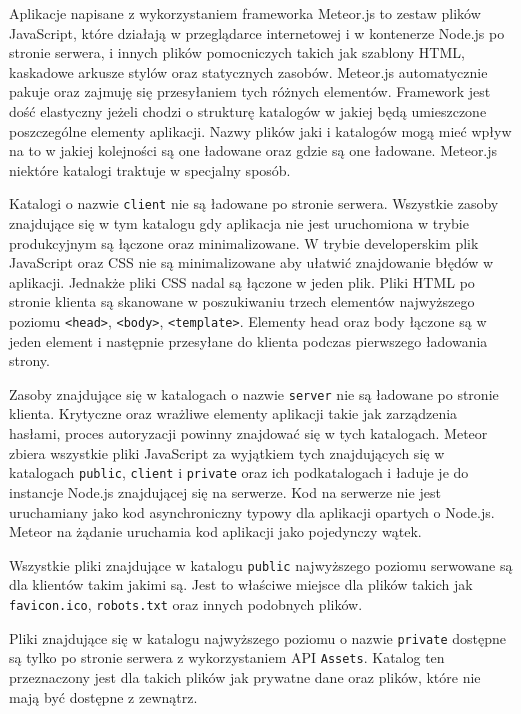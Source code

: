Aplikacje napisane z wykorzystaniem frameworka Meteor.js to zestaw plików JavaScript, które działają w przeglądarce internetowej i w kontenerze Node.js po stronie serwera, i innych plików pomocniczych takich jak szablony HTML, kaskadowe arkusze stylów oraz statycznych zasobów. Meteor.js automatycznie pakuje oraz zajmuję się przesyłaniem tych różnych elementów. Framework jest dość elastyczny jeżeli chodzi o strukturę katalogów w jakiej będą umieszczone poszczególne elementy aplikacji. Nazwy plików jaki i katalogów mogą mieć wpływ na to w jakiej kolejności są one ładowane oraz gdzie są one ładowane. Meteor.js niektóre katalogi traktuje w specjalny sposób.

Katalogi o nazwie \verb|client| nie są ładowane po stronie serwera. Wszystkie zasoby znajdujące się w tym katalogu gdy aplikacja nie jest uruchomiona w trybie produkcyjnym są łączone oraz minimalizowane. W trybie developerskim plik JavaScript oraz CSS nie są minimalizowane aby ułatwić znajdowanie błędów w aplikacji. Jednakże pliki CSS nadal są łączone w jeden plik. Pliki HTML po stronie klienta są skanowane w poszukiwaniu trzech elementów najwyższego poziomu \verb|<head>|, \verb|<body>|, \verb|<template>|. Elementy head oraz body łączone są w jeden element i następnie przesyłane do klienta podczas pierwszego ładowania strony.

Zasoby znajdujące się w katalogach o nazwie \verb|server| nie są ładowane po stronie klienta. Krytyczne oraz wrażliwe elementy aplikacji takie jak zarządzenia hasłami, proces autoryzacji powinny znajdować się w tych katalogach. Meteor zbiera wszystkie pliki JavaScript za wyjątkiem tych znajdujących się w katalogach \verb|public|, \verb|client| i \verb|private| oraz ich podkatalogach i ładuje je do instancje Node.js znajdującej się na serwerze. Kod na serwerze nie jest uruchamiany jako kod asynchroniczny typowy dla aplikacji opartych o Node.js. Meteor na żądanie uruchamia kod aplikacji jako pojedynczy wątek.

Wszystkie pliki znajdujące w katalogu \verb|public| najwyższego poziomu serwowane są dla klientów takim jakimi są. Jest to właściwe miejsce dla plików takich jak \verb|favicon.ico|, \verb|robots.txt| oraz innych podobnych plików.

Pliki znajdujące się w katalogu najwyższego poziomu o nazwie \verb|private| dostępne są tylko po stronie serwera z wykorzystaniem API \verb|Assets|. Katalog ten przeznaczony jest dla takich plików jak prywatne dane oraz plików, które nie mają być dostępne z zewnątrz.

